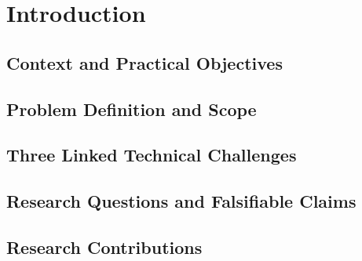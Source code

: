 \chapter{Introduction}
\label{ch:introduction}

\section{Context and Practical Objectives}
\label{sec:1-1}


\section{Problem Definition and Scope}
\label{sec:1-2}


\section{Three Linked Technical Challenges}
\label{sec:1-3}


\section{Research Questions and Falsifiable Claims}
\label{sec:1-4}


\section{Research Contributions}
\label{sec:1-5}

